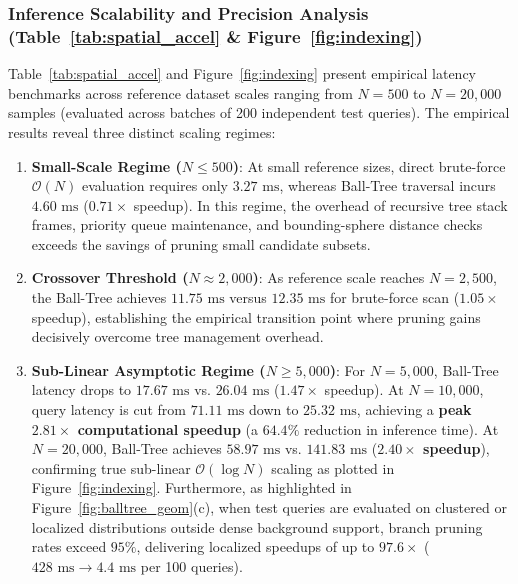 \documentclass[times, review, 10pt]{elsarticle}
\begin{document}
\subsubsection{Inference Scalability and Precision Analysis (Table~\ref{tab:spatial_accel} \& Figure~\ref{fig:indexing})}
Table~\ref{tab:spatial_accel} and Figure~\ref{fig:indexing} present empirical latency benchmarks across reference dataset scales ranging from $N = 500$ to $N = 20,000$ samples (evaluated across batches of 200 independent test queries). The empirical results reveal three distinct scaling regimes:
\begin{enumerate}
    \item \textbf{Small-Scale Regime ($N \le 500$)}: At small reference sizes, direct brute-force $\mathcal{O}(N)$ evaluation requires only $3.27\text{ ms}$, whereas Ball-Tree traversal incurs $4.60\text{ ms}$ ($0.71\times$ speedup). In this regime, the overhead of recursive tree stack frames, priority queue maintenance, and bounding-sphere distance checks exceeds the savings of pruning small candidate subsets.
    \item \textbf{Crossover Threshold ($N \approx 2,000$)}: As reference scale reaches $N = 2,500$, the Ball-Tree achieves $11.75\text{ ms}$ versus $12.35\text{ ms}$ for brute-force scan ($1.05\times$ speedup), establishing the empirical transition point where pruning gains decisively overcome tree management overhead.
    \item \textbf{Sub-Linear Asymptotic Regime ($N \ge 5,000$)}: For $N = 5,000$, Ball-Tree latency drops to $17.67\text{ ms}$ vs. $26.04\text{ ms}$ ($1.47\times$ speedup). At $N = 10,000$, query latency is cut from $71.11\text{ ms}$ down to $25.32\text{ ms}$, achieving a \textbf{peak $2.81\times$ computational speedup} (a $64.4\%$ reduction in inference time). At $N = 20,000$, Ball-Tree achieves $58.97\text{ ms}$ vs. $141.83\text{ ms}$ (\textbf{$2.40\times$ speedup}), confirming true sub-linear $\mathcal{O}(\log N)$ scaling as plotted in Figure~\ref{fig:indexing}. Furthermore, as highlighted in Figure~\ref{fig:balltree_geom}(c), when test queries are evaluated on clustered or localized distributions outside dense background support, branch pruning rates exceed $95\%$, delivering localized speedups of up to \textbf{$97.6\times$} ($428\text{ ms} \to 4.4\text{ ms}$ per 100 queries).
\end{enumerate}
\end{document}
